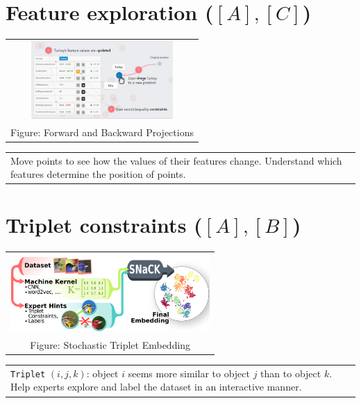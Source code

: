 \documentclass[portrait,final,a0paper]{nadiposter}
\newcommand{\pointer}{\scalebox{1.0}{\ding{43}}}%
\begin{document}
\begin{poster}
{\begin{multicols}{3}
    \section*{Feature exploration \small{($[A],[C]$)}}
    \begin{center}
        \begin{tabular}{c}
            \includegraphics[height=8em]{poster_NADI_2018/images/eg_forward_backward.png}\\
            \tiny{Figure: Forward and Backward Projections \cite{cavallo2017FWBW}}
        \end{tabular}
        \begin{tabular}{p{20em}}
            \quad Move points to see how the values of their features change.
            \pointer
            Understand which features determine the position of points.%
        \end{tabular}
    \end{center}

    \section*{\small{Triplet constraints (\small{$[A],[B]$})}}
    \begin{center}
        \begin{tabular}{c}
            \includegraphics[height=8em]{poster_NADI_2018/images/eg_triplet.png}\\
            \tiny{Figure: Stochastic Triplet Embedding \cite{van2012ste}}
        \end{tabular}
        \begin{tabular}{p{22em}}
            \quad\texttt{Triplet} $(i, j, k)$: object $i$ seems more similar to object $j$ than to object $k$.
            \pointer
            Help experts explore and label the dataset in an interactive manner.
        \end{tabular}
    \end{center}


\end{multicols}}
\end{poster}
\end{document}
